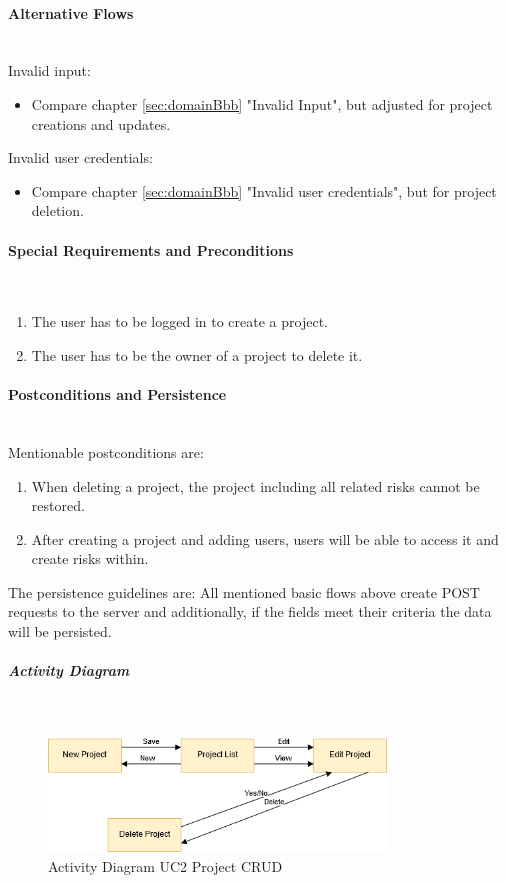 \paragraph*{Alternative Flows}\mbox{}\\
\noindent
Invalid input: 
\begin{itemize}
	\vspace{-3mm}
	\setlength\itemsep{-1em}
	\item Compare chapter \ref{sec:domainBbb} "Invalid Input", but adjusted for project creations and updates.
\end{itemize}

\noindent
Invalid user credentials:
\begin{itemize}
	\vspace{-3mm}
	\setlength\itemsep{-1em}
	\item Compare chapter \ref{sec:domainBbb} "Invalid user credentials", but for project deletion.
\end{itemize}

\paragraph*{Special Requirements and Preconditions}\mbox{}\\

\begin{enumerate}
	\vspace{-3mm}
	\setlength\itemsep{-1em}
	\item The user has to be logged in to create a project. 
	\item The user has to be the owner of a project to delete it.
\end{enumerate}

\paragraph*{Postconditions and Persistence}\mbox{}\\
Mentionable postconditions are:
\begin{enumerate}
	\vspace{-3mm}
	\setlength\itemsep{-1em}
	\item When deleting a project, the project including all related risks cannot be restored.
	\item After creating a project and adding users, users will be able to access it and create risks within.
\end{enumerate}

\noindent
The persistence guidelines are: 
\newline
\noindent
All mentioned basic flows above create POST requests to the server and additionally, if the fields meet their criteria the data will be persisted.

\subparagraph{Activity Diagram}\mbox{}\\
\begin{figure}[H]
	\centering
	\includegraphics[width=0.8\textwidth]{Content/Domain/UC2ProjectCRUDactivitydiagram.png}
	\caption{Activity Diagram \ac{UC}2 Project CRUD}
	\label{fig:activityDiagramUC2}
\end{figure}